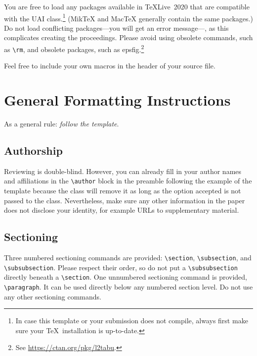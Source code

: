 \documentclass{uai2026} %
\newcommand{\swap}[3][-]{#3#1#2} %
\begin{document}
You are free to load any packages available in \TeX{Live}~2020 that are compatible with the UAI class.\footnote{In case this template or your submission does not compile, always first make sure your \TeX\ installation is up-to-date.}
(Mik\TeX{} and Mac\TeX{} generally contain the same packages.)
Do not load conflicting packages—you will get an error message—, as this complicates creating the proceedings.
Please avoid using obsolete commands, such as \verb|\rm|, and obsolete packages, such as \textsf{epsfig}.\footnote{%
    See \url{https://ctan.org/pkg/l2tabu}.
}

\swap[ ]{in the header of your source file.}{Feel free to include your own macros}

\section{General Formatting Instructions}
As a general rule: \emph{follow the template}.

\subsection{Authorship}
Reviewing is double-blind.
However, you can already fill in your author names and affiliations in the \verb|\author| block in the preamble following the example of the template because the class will remove it as long as the option \textsf{accepted} is not passed to the class.
Nevertheless, make sure any other information in the paper does not disclose your identity, for example URLs to supplementary material.

\subsection{Sectioning}
Three numbered sectioning commands are provided: \verb|\section|, \verb|\subsection|, and \verb|\subsubsection|.
Please respect their order, so do not put a \verb|\subsubsection| directly beneath a \verb|\section|.
One unnumbered sectioning command is provided, \verb|\paragraph|.
It can be used directly below any numbered section level.
Do not use any other sectioning commands.
\end{document}

